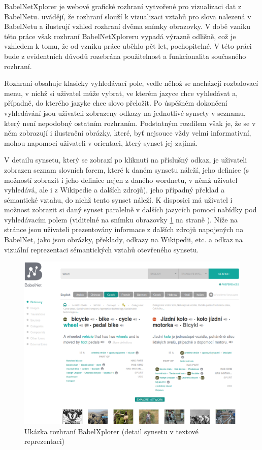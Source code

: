 \documentclass[a4paper, 11pt, oneside]{book}
\begin{document}
				BabelNetXplorer je webové grafické rozhraní vytvořené pro vizualizaci dat z BabelNetu. \cite{navigli2012babelnetxplorer} uvádějí, že rozhraní slouží k vizualizaci vztahů pro slova nalezená v BabelNetu a ilustrují vzhled rozhraní dvěma snímky obrazovky. V době vzniku této práce však rozhraní BabelNetXploreru vypadá výrazně odlišně, což je vzhledem k tomu, že od vzniku práce \cite{navigli2012babelnetxplorer} uběhlo pět let, pochopitelné. V této práci bude z evidentních důvodů rozebrána použitelnost a funkcionalita současného rozhraní.

				Rozhraní obsahuje klasicky vyhledávací pole, vedle něhož se nacházejí rozbalovací menu, v nichž si uživatel může vybrat, ve kterém jazyce chce vyhledávat a, případně, do kterého jazyke chce slovo přeložit. Po úspěšném dokončení vyhledávání jsou uživateli zobrazeny odkazy na jednotlivé synsety v seznamu, který není nepodobný ostatním rozhraním. Podstatným rozdílem však je, že se v něm zobrazují i ilustrační obrázky, které, byť nejsouce vždy velmi informativní, mohou napomoci uživateli v orientaci, který synset jej zajímá. 

				V detailu synsetu, který se zobrazí po kliknutí na příslušný odkaz, je uživateli zobrazen seznam slovních forem, které k daném synsetu náleží, jeho definice (s možností zobrazit i jeho definice nejen z daného wordnetu, v němž uživatel vyhledává, ale i z Wikipedie a dalších zdrojů), jeho případný překlad a sémantické vztahu, do nichž tento synset náleží. K disposici má uživatel i možnost zobrazit si daný synset paralelně v dalších jazycích pomocí nabídky pod vyhledávacím polem (viditelné na snímku obrazovky \ref{fig:babelxplorer} na straně \pageref{fig:babelxplorer}). Níže na stránce jsou uživateli prezentovány informace z dalších zdrojů napojených na BabelNet, jako jsou obrázky, překlady, odkazy na Wikipedii, etc. a odkaz na vizuální reprezentaci sémantických vztahů otevřeného synsetu. 

				\begin{figure}[h]
					\centering
					\includegraphics[width=1.0\textwidth]{babelxplorer.png}
					\caption{Ukázka rozhraní BabelXplorer (detail synsetu v textové reprezentaci)}
					\label{fig:babelxplorer}
				\end{figure}
\end{document}
